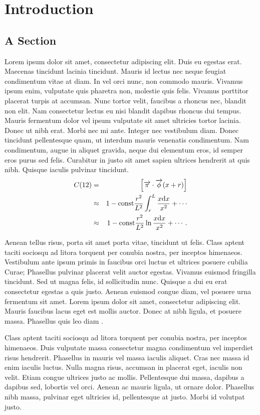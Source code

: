 \chapter{Introduction}

\section{A Section}
Lorem ipsum dolor sit amet, consectetur adipiscing elit. Duis eu egestas erat. Maecenas tincidunt lacinia tincidunt. Mauris id lectus nec neque feugiat condimentum vitae at diam. In vel orci nunc, non commodo mauris. Vivamus ipsum enim, vulputate quis pharetra non, molestie quis felis. Vivamus porttitor placerat turpis at accumsan. Nunc tortor velit, faucibus a rhoncus nec, blandit non elit. Nam consectetur lectus eu nisi blandit dapibus rhoncus dui tempus. Mauris fermentum dolor vel ipsum vulputate sit amet ultricies tortor lacinia. Donec ut nibh erat. Morbi nec mi ante. Integer nec vestibulum diam. Donec tincidunt pellentesque quam, ut interdum mauris venenatis condimentum. Nam condimentum, augue in aliquet gravida, neque dui elementum eros, id semper eros purus sed felis. Curabitur in justo sit amet sapien ultrices hendrerit at quis nibh. Quisque iaculis pulvinar tincidunt. 
\begin{eqnarray}
C(12) &= &\left[\overrightarrow{\pi}\cdot\overrightarrow{\phi}(x+r)\right] \nonumber \\ 
&\approx& 1-\mathrm{const}\frac{r^2}{L^2}\int_r^L\frac{x\mathrm{d} x}{x^2} + \cdots \nonumber  \\
&\approx& 1-\mathrm{const}\frac{r^2}{L^2}\ln\frac{x\mathrm{d} x}{x^2} + \cdots .\label{brokenlongeqn}
\end{eqnarray}

Aenean tellus risus, porta sit amet porta vitae, tincidunt ut felis. Class aptent taciti sociosqu ad litora torquent per conubia nostra, per inceptos himenaeos. Vestibulum ante ipsum primis in faucibus orci luctus et ultrices posuere cubilia Curae; Phasellus pulvinar placerat velit auctor egestas. Vivamus euismod fringilla tincidunt. Sed ut magna felis, id sollicitudin nunc. Quisque a dui eu erat consectetur egestas a quis justo. Aenean euismod congue diam, vel posuere urna fermentum sit amet. Lorem ipsum dolor sit amet, consectetur adipiscing elit. Mauris faucibus lacus eget est mollis auctor. Donec at nibh ligula, et posuere massa. Phasellus quis leo diam \cite{diamantaras1996pcn}.

Class aptent taciti sociosqu ad litora torquent per conubia nostra, per inceptos himenaeos. Duis vulputate massa consectetur magna condimentum vel
imperdiet risus hendrerit. Phasellus in mauris vel massa iaculis aliquet. 
Cras nec massa id enim iaculis luctus. Nulla magna risus, accumsan in placerat eget, iaculis non velit. Etiam congue ultrices justo ac mollis. Pellentesque dui massa, dapibus a dapibus sed, lobortis vel orci. Aenean ac mauris ligula, ut ornare dolor. Phasellus nibh massa, pulvinar eget ultricies id, pellentesque at justo. Morbi id volutpat justo. 


